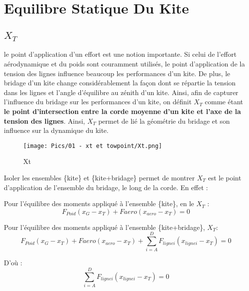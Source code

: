 \chapter{Equilibre Statique Du Kite}
\label{ch:Ch1}

\section{\textbf{$X_{T}$}} 
\label{sec:Ch1.1}

le point d'application d'un effort est une notion importante. Si celui de l'effort aérodynamique et du poids sont couramment utilisés, le point d'application de la tension des lignes influence beaucoup les performances d'un kite. De plus, le bridage d'un kite change considérablement la façon dont se répartie la tension dans les lignes et l'angle d'équilibre au zénith d'un kite. Ainsi, afin de capturer l'influence du bridage sur les performances d'un kite, on définit $X_T$ comme étant \textbf{le point d'intersection entre la corde moyenne d'un kite et l'axe de la tension des lignes}. Ainsi, $X_T$ permet de lié la géométrie du bridage et son influence sur la dynamique du kite.  \\

\begin{figure}[H]
    \centering
    \texttt{[image: Pics/01 - xt et towpoint/Xt.png]}  
    \caption{Xt}
    \label{fig:Xt}
\end{figure}

Isoler les ensembles \{kite\} et \{kite+bridage\} permet de montrer $X_T$ est le point d'application de l'ensemble du bridage, le long de la corde. En effet :

Pour l'équilibre des moments appliqué à l'ensemble \{kite\}, en le $X_T$ :
\begin{equation}
    F_{Poid}(x_G-x_T)+F{aero}(x_{aero}-x_T) = 0
\end{equation}

Pour l'équilibre des moments appliqué à l'ensemble \{kite+bridage\}, $X_T$:
\begin{equation}
    F_{Poid}(x_G-x_T) + F{aero}(x_{aero}-x_T) + \sum_{i=A}^{D} F_{ligne i}(x_{ligne i}-x_T)= 0
\end{equation}

D'où : 
\begin{equation}
    \sum_{i=A}^{D} F_{ligne i}(x_{ligne i}-x_T)= 0
\end{equation}

